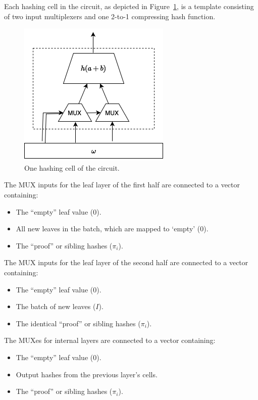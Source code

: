 \documentclass[twocolumn]{article}
\begin{document}
Each hashing cell in the circuit, as depicted in Figure~\ref{fi:smt-circuit-cell}, is a template consisting of two input multiplexers and one 2-to-1 compressing hash function.

\begin{figure}[t]
    \centering
    \includegraphics[width=.6\columnwidth]{pic/smt-circuit-cell.drawio}
    \caption{One hashing cell of the circuit.}\label{fi:smt-circuit-cell}
\end{figure}


The MUX inputs for the leaf layer of the first half are connected to a vector containing:
\begin{itemize}
    \item The ``empty'' leaf value ($0$).
    \item All new leaves in the batch, which are mapped to `empty' ($0$).
    \item The ``proof'' or sibling hashes ($\pi_i$).
\end{itemize}

The MUX inputs for the leaf layer of the second half are connected to a vector containing:
\begin{itemize}
    \item The ``empty'' leaf value ($0$).
    \item The batch of new leaves ($I$).
    \item The identical ``proof'' or sibling hashes ($\pi_i$).
\end{itemize}

The MUXes for internal layers are connected to a vector containing:
\begin{itemize}
    \item The ``empty'' leaf value ($0$).
    \item Output hashes from the previous layer's cells.
    \item The ``proof'' or sibling hashes ($\pi_i$).
\end{itemize}
\end{document}
